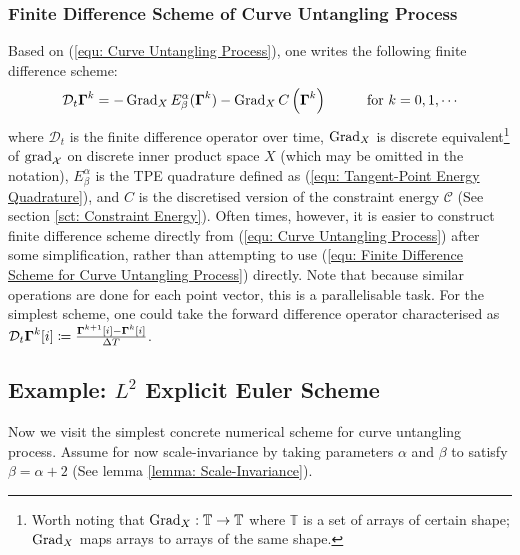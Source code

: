\documentclass[../dissertation.tex]{subfiles}
\begin{document}
\subsubsection{Finite Difference Scheme of Curve Untangling Process}
Based on (\ref{equ: Curve Untangling Process}), one writes the following finite difference scheme:
\begin{equation}
    \mathcal{D}_{t} \Gammabf^{k} = -\Grad_{X} E_{\beta}^{\alpha} (\Gammabf^k) - \Grad_{X} C \left( \Gammabf^k \right) \hspace{1cm} \text{for } k=0,1,\cdots
    \label{equ: Finite Difference Scheme for Curve Untangling Process}
\end{equation}
where $\mathcal{D}_t$ is the finite difference operator over time,
$\operatorname{Grad}_{X}$ is discrete equivalent\footnote{Worth noting that $\operatorname{Grad}_X:\mathbb{T} \rightarrow \mathbb{T}$ where $\mathbb{T}$ is a set of arrays of certain shape; $\operatorname{Grad}_X$ maps arrays to arrays of the same shape.}  of $\operatorname{grad}_{\mathcal{X}}$ on discrete inner product space $X$ (which may be omitted in the notation),
$E_{\beta}^{\alpha}$ is the TPE quadrature defined as (\ref{equ: Tangent-Point Energy Quadrature}),
and $C$ is the discretised version of the constraint energy $\mathcal{C}$ (See section \ref{sct: Constraint Energy}).
Often times, however, it is easier to construct finite difference scheme directly from (\ref{equ: Curve Untangling Process}) after some simplification,
rather than attempting to use (\ref{equ: Finite Difference Scheme for Curve Untangling Process}) directly.
Note that because similar operations are done for each point vector, this is a parallelisable task.
For the simplest scheme, one could take the forward difference operator characterised as $\mathcal{D}_t \boldsymbol{\Gamma}^k[i] \coloneqq \frac{\boldsymbol{\Gamma}^{k+1}[i] - \boldsymbol{\Gamma}^{k}[i]}{\Delta T}$.

\subsection{Example: $L^2$ Explicit Euler Scheme}
Now we visit the simplest concrete numerical scheme for curve untangling process.
Assume for now scale-invariance by taking parameters $\alpha$ and $\beta$ to satisfy $\beta = \alpha+2$ (See lemma \ref{lemma: Scale-Invariance}).
\end{document}
